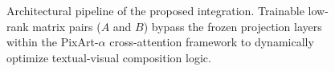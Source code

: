 \begin{figure}[!t]
\caption{Architectural pipeline of the proposed integration. Trainable low-rank matrix pairs ($A$ and $B$) bypass the frozen projection layers within the PixArt-$\alpha$ cross-attention framework to dynamically optimize textual-visual composition logic.}
\label{fig:lora_dit_structure}
\end{figure}
